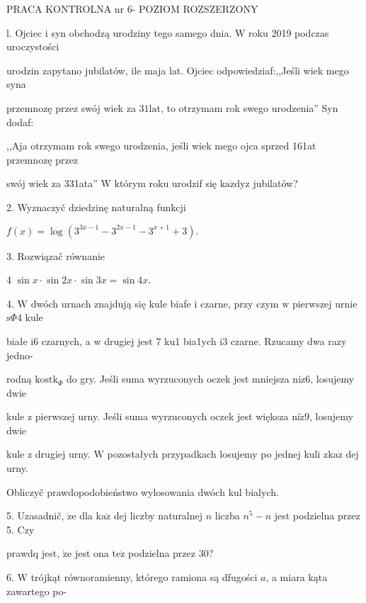 \documentclass[a4paper,12pt]{article}
\begin{document}
PRACA KONTROLNA nr 6- POZIOM ROZSZERZONY

l. Ojciec $\mathrm{i}$ syn obchodzą urodziny tego samego dnia. $\mathrm{W}$ roku 2019 podczas uroczystości

urodzin zapytano jubilatów, ile maja lat. Ojciec odpowiedziaf:,,Jeśli wiek mego syna

przemnozę przez swój wiek za $31\mathrm{l}\mathrm{a}\mathrm{t}$, to otrzymam rok swego urodzenia'' Syn dodaf:

,,Aja otrzymam rok swego urodzenia, jeśli wiek mego ojca sprzed 161at przemnozę przez

swój wiek za 331ata'' $\mathrm{W}$ którym roku urodzif się $\mathrm{k}\mathrm{a}\dot{\mathrm{z}}\mathrm{d}\mathrm{y}\mathrm{z}$ jubilatów?

2. Wyznaczyč dziedzinę naturalną funkcji

$f(x)=\log(3^{3x-1}-3^{2x-1}-3^{x+1}+3).$

3. Rozwiązač równanie

4 $\sin x\cdot\sin 2x\cdot\sin 3x=\sin 4x.$

4. $\mathrm{W}$ dwóch urnach znajdują się kule biafe $\mathrm{i}$ czarne, przy czym $\mathrm{w}$ pierwszej urnie $\mathrm{s}\Phi 4$ kule

białe $\mathrm{i}6$ czarnych, a $\mathrm{w}$ drugiej jest 7 ku1 bia1ych $\mathrm{i}3$ czarne. Rzucamy dwa razy jedno-

rodną $\mathrm{k}\mathrm{o}\mathrm{s}\mathrm{t}\mathrm{k}_{\Phi}$ do gry. Jeśli suma wyrzuconych oczek jest mniejsza $\mathrm{n}\mathrm{i}\dot{\mathrm{z}}6$, losujemy dwie

kule $\mathrm{z}$ pierwszej urny. Jeśli suma wyrzuconych oczek jest większa $\mathrm{n}\mathrm{i}\dot{\mathrm{z}}9$, losujemy dwie

kule $\mathrm{z}$ drugiej urny. $\mathrm{W}$ pozostałych przypadkach losujemy po jednej kuli $\mathrm{z}\mathrm{k}\mathrm{a}\dot{\mathrm{z}}$ dej urny.

Obliczyč prawdopodobieństwo wylosowania dwóch kul bialych.

5. Uzasadnič, $\dot{\mathrm{z}}\mathrm{e}$ dla $\mathrm{k}\mathrm{a}\dot{\mathrm{z}}$ dej liczby naturalnej $n$ liczba $n^{5}-n$ jest podzielna przez 5. Czy

prawdq jest, $\dot{\mathrm{z}}\mathrm{e}$ jest ona $\mathrm{t}\mathrm{e}\dot{\mathrm{z}}$ podzielna przez 30?

6. $\mathrm{W}$ trójkąt równoramienny, którego ramiona są dfugości $a$, a miara kąta zawartego po-
\end{document}
